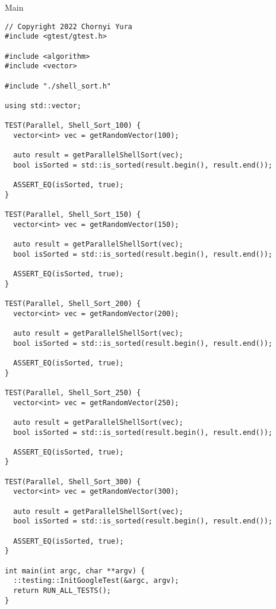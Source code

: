 \documentclass{report}
\begin{document}
\begin{center}
Main
\end{center}
\begin{lstlisting}
// Copyright 2022 Chornyi Yura
#include <gtest/gtest.h>

#include <algorithm>
#include <vector>

#include "./shell_sort.h"

using std::vector;

TEST(Parallel, Shell_Sort_100) {
  vector<int> vec = getRandomVector(100);

  auto result = getParallelShellSort(vec);
  bool isSorted = std::is_sorted(result.begin(), result.end());

  ASSERT_EQ(isSorted, true);
}

TEST(Parallel, Shell_Sort_150) {
  vector<int> vec = getRandomVector(150);

  auto result = getParallelShellSort(vec);
  bool isSorted = std::is_sorted(result.begin(), result.end());

  ASSERT_EQ(isSorted, true);
}

TEST(Parallel, Shell_Sort_200) {
  vector<int> vec = getRandomVector(200);

  auto result = getParallelShellSort(vec);
  bool isSorted = std::is_sorted(result.begin(), result.end());

  ASSERT_EQ(isSorted, true);
}

TEST(Parallel, Shell_Sort_250) {
  vector<int> vec = getRandomVector(250);

  auto result = getParallelShellSort(vec);
  bool isSorted = std::is_sorted(result.begin(), result.end());

  ASSERT_EQ(isSorted, true);
}

TEST(Parallel, Shell_Sort_300) {
  vector<int> vec = getRandomVector(300);

  auto result = getParallelShellSort(vec);
  bool isSorted = std::is_sorted(result.begin(), result.end());

  ASSERT_EQ(isSorted, true);
}

int main(int argc, char **argv) {
  ::testing::InitGoogleTest(&argc, argv);
  return RUN_ALL_TESTS();
}
\end{lstlisting}
\end{document}
